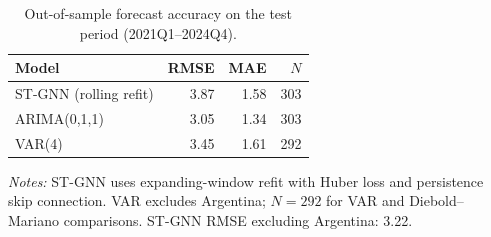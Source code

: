 \begin{table}[ht]
  \centering
  \caption{Out-of-sample forecast accuracy on the test period (2021Q1--2024Q4).}
  \label{tab:benchmark}
  \begin{tabular}{lrrr}
    \toprule
    Model & RMSE & MAE & $N$ \\
    \midrule
    ST-GNN (rolling refit) & 3.87 & 1.58 & 303 \\
    ARIMA(0,1,1)           & 3.05 & 1.34 & 303 \\
    VAR(4)                 & 3.45 & 1.61 & 292 \\
    \bottomrule
  \end{tabular}
  \vspace{0.5em}
  \begin{minipage}{\linewidth}
    \footnotesize
    \textit{Notes:} ST-GNN uses expanding-window refit with Huber loss and persistence skip connection.
    VAR excludes Argentina; $N=292$ for VAR and Diebold--Mariano comparisons.
    ST-GNN RMSE excluding Argentina: 3.22.
  \end{minipage}
\end{table}